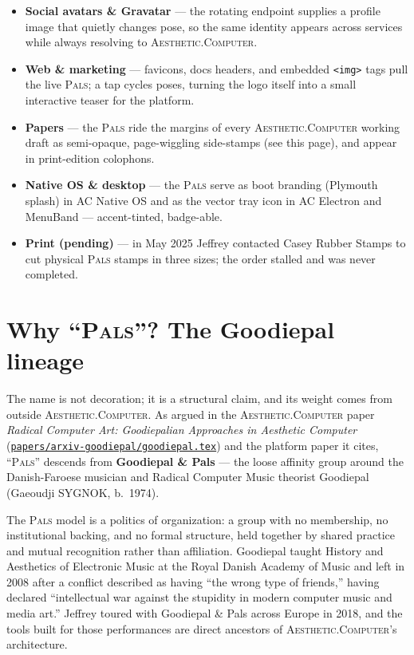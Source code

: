 \documentclass[10pt,letterpaper,twocolumn]{article}
\newcommand{\ac}{\textsc{Aesthetic}{\color{acpink}.}\textsc{Computer}}
\newcommand{\pals}{\textsc{Pals}}
\newcommand{\repofile}[1]{\href{https://github.com/whistlegraph/aesthetic-computer/blob/main/#1}{\texttt{#1}}}
\begin{document}
\begin{itemize}
  \item \textbf{Social avatars \& Gravatar} --- the rotating endpoint
        supplies a profile image that quietly changes pose, so the same
        identity appears across services while always resolving to
        \ac{}.
  \item \textbf{Web \& marketing} --- favicons, docs headers, and
        embedded \texttt{<img>} tags pull the live \pals{}; a tap cycles
        poses, turning the logo itself into a small interactive teaser
        for the platform.
  \item \textbf{Papers} --- the \pals{} ride the margins of every \ac{}
        working draft as semi-opaque, page-wiggling side-stamps (see this
        page), and appear in print-edition colophons.
  \item \textbf{Native OS \& desktop} --- the \pals{} serve as boot
        branding (Plymouth splash) in AC Native OS and as the vector
        tray icon in AC Electron and MenuBand --- accent-tinted, badge-able.
  \item \textbf{Print (pending)} --- in May 2025 Jeffrey contacted Casey
        Rubber Stamps to cut physical \pals{} stamps in three sizes;
        the order stalled and was never completed.
\end{itemize}

\section{Why ``\pals{}''? The Goodiepal lineage}

The name is not decoration; it is a structural claim, and its weight
comes from outside \ac{}. As argued in the \ac{} paper
\emph{Radical Computer Art: Goodiepalian Approaches in Aesthetic
Computer} (\repofile{papers/arxiv-goodiepal/goodiepal.tex}) and the
platform paper it cites, ``\pals{}'' descends from \textbf{Goodiepal \&
Pals} --- the loose affinity group around the Danish-Faroese musician and
Radical Computer Music theorist Goodiepal (Gaeoudji SYGNOK, b.~1974).

The \pals{} model is a politics of organization: a group with no
membership, no institutional backing, and no formal structure, held
together by shared practice and mutual recognition rather than
affiliation. Goodiepal taught History and Aesthetics of Electronic Music
at the Royal Danish Academy of Music and left in 2008 after a conflict
described as having ``the wrong type of friends,'' having declared
``intellectual war against the stupidity in modern computer music and
media art.'' Jeffrey toured with Goodiepal \& Pals across Europe in 2018,
and the tools built for those performances are direct ancestors of
\ac{}'s architecture.
\end{document}
